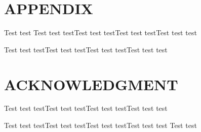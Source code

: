 \documentclass[a4paper, 10pt, conference]{ieeeconf}
\begin{document}






\section*{APPENDIX}

Test test
Test test testTest test testTest test testTest test test

Test test testTest test testTest test testTest test test

\section*{ACKNOWLEDGMENT}

Test test testTest test testTest test testTest test test

Test test testTest test testTest test testTest test test
Test test



\nocite{*}


\end{document}
